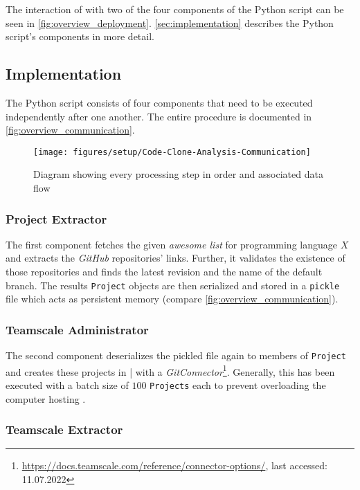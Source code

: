 The interaction of \teamscale{} with two of the four components of the Python script\gitFootnote{} can be seen in \autoref{fig:overview_deployment}. \autoref{sec:implementation} describes the Python script's components in more detail.

\subsection{Implementation}
\label{sec:implementation}

The Python script consists of four components that need to be executed independently after one another. The entire procedure is documented in \autoref{fig:overview_communication}.

\begin{figure}[tbh]
	\centering
	\texttt{[image: figures/setup/Code-Clone-Analysis-Communication]}
	\caption{Diagram showing every processing step in order and associated data flow}
	\label{fig:overview_communication}
\end{figure}

\subsubsection{Project Extractor}

The first component fetches the given \textit{awesome list} for programming language $X$ and extracts the \textit{GitHub} repositories’ links. Further, it validates the existence of those repositories and finds the latest revision and the name of the default branch. The results \texttt{Project} objects are then serialized and stored in a \texttt{pickle} file which acts as persistent memory (compare \autoref{fig:overview_communication}).

\subsubsection{Teamscale Administrator}

The second component deserializes the pickled file again to members of \texttt{Project} and creates these projects in \teamscale|{} with a \textit{GitConnector}\footnote{\url{https://docs.teamscale.com/reference/connector-options/}, last accessed: 11.07.2022}. Generally, this has been executed with a batch size of $100$ \texttt{Projects} each to prevent overloading the computer hosting \teamscale{}.

\subsubsection{Teamscale Extractor}

